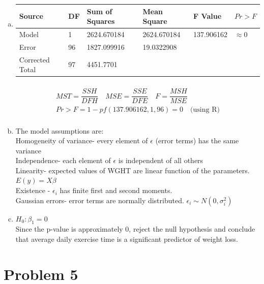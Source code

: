 \documentclass{article}
\newcommand{\B}{\beta}
\begin{document}
\begin{flushleft}
\begin{enumerate}[(a)]
	\item 	
\begin{tabular}{l|l|l|l|l|l}
\hline
Source&DF  &Sum of Squares  & Mean Square  & F Value & $Pr>F$  \\
\hline
Model&1  &2624.670184  &2624.670184  &137.906162& $\approx 0$ \\
\hline
Error& 96 & 1827.099916  & 19.0322908 &  \\
\hline
Corrected Total&97  &4451.7701  &  & \\
\hline
\end{tabular}
\begin{multline*}\\
MST=\dfrac{SSH}{DFH} \quad MSE=\dfrac{SSE}{DFE} \quad F=\dfrac{MSH}{MSE}\\
Pr>F =1-pf(137.906162,1,96)=0 \quad \text{(using R)}\\
\end{multline*}

	\item 
The model assumptions are:\\
Homogeneity of variance- every element of $\epsilon$ (error terms) has the same variance\\
Independence- each element of $\epsilon$ is independent of all others\\
Linearity- expected values of WGHT are linear function of the parameters. $E(y)=X\beta$\\
Existence - $\epsilon_i$ has finite first and second moments.\\
Gaussian errors- error terms are normally distributed. $\epsilon_i \sim N(0,\sigma_i^2)$\\

	\item 
$H_0:\B_1=0$\\
Since the p-value is approximately 0, reject the null hypothesis and conclude that average daily exercise time is a significant predictor of weight loss. \\

\end{enumerate}

	\section*{Problem 5}
\begin{enumerate}[(a)]
	

\end{enumerate}
\end{flushleft}
\end{document}
